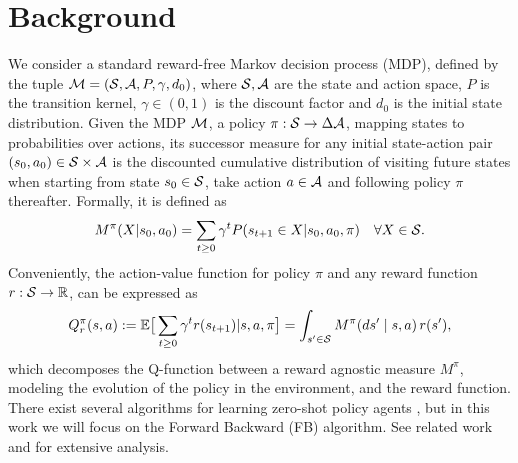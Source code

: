 \section{Background}

We consider a standard reward-free Markov decision process (MDP), defined by the tuple \mbox{${\mathcal{M}} = ({\mathcal{S}}, {\mathcal{A}}, P, \gamma, d_0)$}, where ${\mathcal{S}}, {\mathcal{A}}$ are the state and action space, $P$ is the transition kernel, $\gamma \in (0,1)$ is the discount factor and $d_0$ is the initial state distribution.
Given the MDP ${\mathcal{M}}$, a policy \mbox{$\pi: {\mathcal{S}} \rightarrow \Delta{\mathcal{A}}$}, mapping states to probabilities over actions, its successor measure \citep{dayan1993improving, blier2021} for any initial state-action pair \mbox{$(s_0, a_0) \in {\mathcal{S}} \times {\mathcal{A}}$} is the discounted cumulative distribution of visiting future states when starting from state $s_0 \in {\mathcal{S}}$, take action $a \in {\mathcal{A}}$ and following policy $\pi$ thereafter. Formally, it is defined as
\begin{equation}
\label{eq:succesor_measure}
    M^\pi( X | s_0, a_0 ) = \sum_{t\geq0}\gamma^t P(s_{t+1} \in X | s_0, a_0, \pi) \quad \forall X \in {\mathcal{S}}.
\end{equation}
Conveniently, the action-value function for policy $\pi$ and any reward function $r: {\mathcal{S}} \rightarrow {\mathbb{R}}$, can be expressed as
\begin{equation}
\label{eq:q_from_successor}
Q_r^\pi(s,a) := \mathbb{E} \big[ \sum_{t\geq0}\gamma^t r(s_{t+1}) | s,a,\pi \big] = \int_{s'\in{\mathcal{S}}} M^\pi(ds' \mid s,a)\, r(s'),
\end{equation}
which decomposes the Q-function between a reward agnostic measure $M^\pi$, modeling the evolution of the policy in the environment, and the reward function.
There exist several algorithms for learning zero-shot policy agents \citep{eysenbachc, borsauniversal, agarwal2024proto}, but in this work we will focus on the Forward Backward (FB) \citep{touati2021learning,touati2023does} algorithm. See related work and  for extensive analysis.



